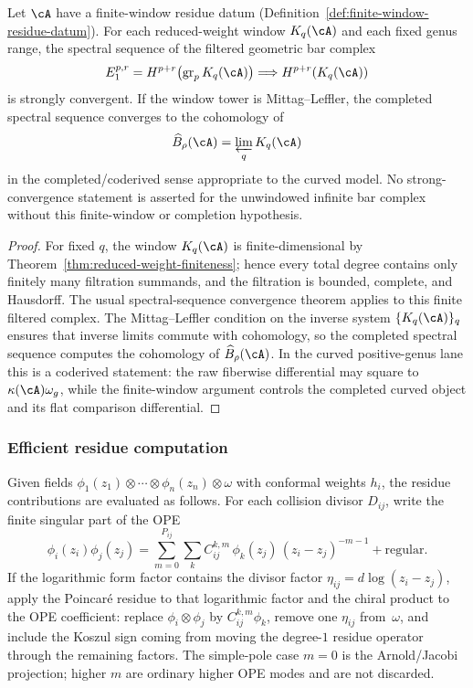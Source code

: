 \begin{theorem}\label{thm:spectral-convergence}
\ClaimStatusProvedHere
Let $\cA$ have a finite-window residue datum
\textup{(}Definition~\textup{\ref{def:finite-window-residue-datum}}\textup{)}.
For each reduced-weight window $K_q(\cA)$ and each fixed genus range,
the spectral sequence of the filtered geometric bar complex
\[
E_1^{p,r}
=H^{p+r}\!\left(\operatorname{gr}_p K_q(\cA)\right)
\Longrightarrow
H^{p+r}\!\left(K_q(\cA)\right)
\]
is strongly convergent. If the window tower is Mittag--Leffler, the
completed spectral sequence converges to the cohomology of
\[
\widehat B_\rho(\cA)=\varprojlim_q K_q(\cA)
\]
in the completed/coderived sense appropriate to the curved model. No
strong-convergence statement is asserted for the unwindowed infinite bar
complex without this finite-window or completion hypothesis.
\end{theorem}

\begin{proof}
For fixed $q$, the window $K_q(\cA)$ is finite-dimensional by
Theorem~\ref{thm:reduced-weight-finiteness}; hence every total degree
contains only finitely many filtration summands, and the filtration is
bounded, complete, and Hausdorff. The usual spectral-sequence
convergence theorem applies to this finite filtered complex. The
Mittag--Leffler condition on the inverse system $\{K_q(\cA)\}_q$
ensures that inverse limits commute with cohomology, so the completed
spectral sequence computes the cohomology of
$\widehat B_\rho(\cA)$. In the curved positive-genus lane this is a
coderived statement: the raw fiberwise differential may square to
$\kappa(\cA)\omega_g$, while the finite-window argument controls the
completed curved object and its flat comparison differential.
\end{proof}

\subsubsection{Efficient residue computation}

\begin{construction}\label{con:residue-evaluation}
Given fields $\phi_1(z_1) \otimes \cdots \otimes \phi_n(z_n) \otimes \omega$ with conformal weights $h_i$, the residue contributions are evaluated as follows.
For each collision divisor $D_{ij}$, write the finite singular part of
the OPE
\[
\phi_i(z_i)\phi_j(z_j)
=\sum_{m=0}^{P_{ij}}\sum_k
C^{k,m}_{ij}\,\phi_k(z_j)\,(z_i-z_j)^{-m-1}
+\text{regular}.
\]
If the logarithmic form factor contains the divisor factor
$\eta_{ij}=d\log(z_i-z_j)$, apply the Poincar\'e residue to that
logarithmic factor and the chiral product to the OPE coefficient:
replace $\phi_i\otimes\phi_j$ by $C^{k,m}_{ij}\phi_k$, remove one
$\eta_{ij}$ from~$\omega$, and include the Koszul sign coming from
moving the degree-$1$ residue operator through the remaining factors.
The simple-pole case $m=0$ is the Arnold/Jacobi projection; higher
$m$ are ordinary higher OPE modes and are not discarded.
\end{construction}


